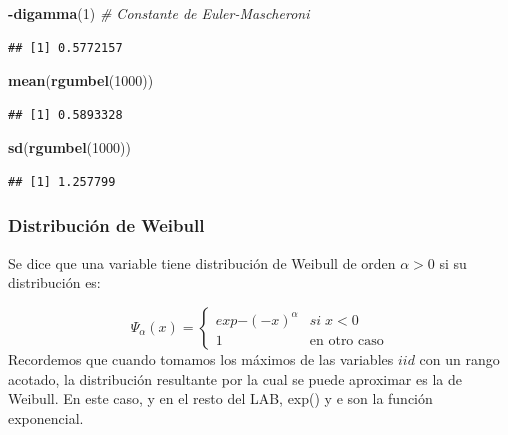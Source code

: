\documentclass[
]{book}
\newenvironment{Shaded}{\begin{snugshade}}{\end{snugshade}}
\newcommand{\CommentTok}[1]{\textcolor[rgb]{0.56,0.35,0.01}{\textit{#1}}}
\newcommand{\DecValTok}[1]{\textcolor[rgb]{0.00,0.00,0.81}{#1}}
\newcommand{\FunctionTok}[1]{\textcolor[rgb]{0.13,0.29,0.53}{\textbf{#1}}}
\newcommand{\NormalTok}[1]{#1}
\newcommand{\SpecialCharTok}[1]{\textcolor[rgb]{0.81,0.36,0.00}{\textbf{#1}}}
\theoremstyle{definition}
\theoremstyle{definition}
\theoremstyle{definition}
\theoremstyle{definition}
\theoremstyle{remark}
\begin{document}
\begin{Shaded}
\begin{Highlighting}[]
\SpecialCharTok{{-}}\FunctionTok{digamma}\NormalTok{(}\DecValTok{1}\NormalTok{) }\CommentTok{\# Constante de Euler{-}Mascheroni}
\end{Highlighting}
\end{Shaded}

\begin{verbatim}
## [1] 0.5772157
\end{verbatim}

\begin{Shaded}
\begin{Highlighting}[]
\FunctionTok{mean}\NormalTok{(}\FunctionTok{rgumbel}\NormalTok{(}\DecValTok{1000}\NormalTok{))}
\end{Highlighting}
\end{Shaded}

\begin{verbatim}
## [1] 0.5893328
\end{verbatim}

\begin{Shaded}
\begin{Highlighting}[]
\FunctionTok{sd}\NormalTok{(}\FunctionTok{rgumbel}\NormalTok{(}\DecValTok{1000}\NormalTok{))}
\end{Highlighting}
\end{Shaded}

\begin{verbatim}
## [1] 1.257799
\end{verbatim}

\subsubsection{Distribución de Weibull}\label{distribuciuxf3n-de-weibull}

Se dice que una variable tiene distribución de
Weibull de orden \(\alpha>0\) si su distribución es:

\[\Psi_{\alpha}(x)=\begin{cases}
exp{-(-x)^{\alpha}} & si\;x<0\\
1 & \text{en otro caso}
\end{cases}\]
Recordemos que cuando tomamos los máximos de las variables \(iid\) con un rango acotado, la distribución resultante por la cual se puede aproximar es la de Weibull. En este caso, y en el resto del LAB, exp() y e son la función exponencial.
\end{document}
